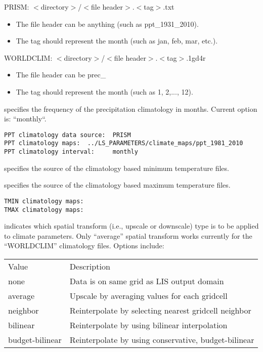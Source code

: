  PRISM: $<$directory$>$/$<$file header$>$.$<$tag$>$.txt
 \begin{itemize} 
 \item[] The file header can be anything (such as ppt\_1931\_2010).
 \item[] The tag should represent the month
         (such as jan, feb, mar, etc.).
 \end{itemize} 
 WORLDCLIM:  $<$directory$>$/$<$file header$>$.$<$tag$>$.1gd4r
 \begin{itemize} 
 \item[] The file header can be prec\_
 \item[] The tag should represent the month (such as 1, 2,..., 12).
 \end{itemize} 
  specifies the frequency of the
 precipitation climatology in months.  Current option is: ``monthly``.
 

 \begin{Verbatim}[frame=single]
PPT climatology data source:  PRISM
PPT climatology maps:  ../LS_PARAMETERS/climate_maps/ppt_1981_2010
PPT climatology interval:     monthly
 \end{Verbatim}

 
 
  specifies the source of the climatology
 based minimum temperature files.

  specifies the source of the climatology
 based maximum temperature files.
 

 \begin{Verbatim}[frame=single]
TMIN climatology maps:
TMAX climatology maps:
 \end{Verbatim}
 

 
  indicates which spatial
 transform (i.e., upscale or downscale) type is to be applied to
 climate parameters. Only ``average'' spatial transform works currently
 for the ``WORLDCLIM'' climatology files.
 Options include:

 \begin{tabular}{ll}
 Value   & Description                                   \\
 none    & Data is on same grid as LIS output domain     \\
 average   & Upscale by averaging values for each gridcell       \\
 neighbor  & Reinterpolate by selecting nearest gridcell neighbor \\
 bilinear  & Reinterpolate by using bilinear interpolation        \\
 budget-bilinear & Reinterpolate by using conservative, budget-bilinear \\
 \end{tabular}
 

